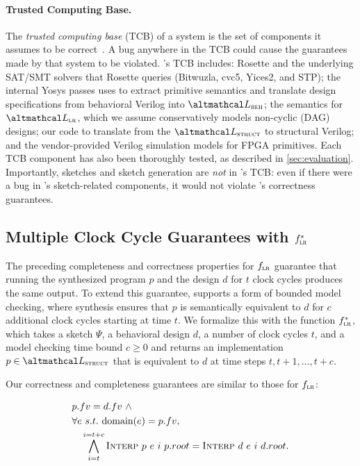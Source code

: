 \paragraph{Trusted Computing Base.}

The \textit{trusted computing base} (TCB) of a
  system is the set of components
  it assumes to be correct~\cite{MacKenzieComputingTrust}.
A bug anywhere in the TCB
  could cause the guarantees
  made by that system to be violated.
\lr's  TCB includes:
  Rosette and the underlying
      SAT/SMT solvers that Rosette queries
      (Bitwuzla, cvc5, Yices2, and STP);
  the internal Yosys passes \lr
      uses to extract primitive semantics
      and translate design specifications
      from behavioral Verilog into
      $\SpecLang$;
  the semantics for $\UberLang$,
    which we assume conservatively
    models non-cyclic (DAG) designs;
  our code to translate from
      the $\ImplLang$ to
      structural Verilog; and
  the vendor-provided Verilog
    simulation models for FPGA primitives.
Each TCB component 
  has also been thoroughly tested,
  as described in \cref{sec:evaluation}.
Importantly,
  sketches and sketch generation
  are \textit{not} in \lr's TCB: %
  even if there were a
  bug in \lr's sketch-related components,
  it would not violate
  \lr's correctness guarantees.


\subsection{Multiple Clock Cycle Guarantees with $\text{$f_{\textsc{lr}}^{*}$}$}
\label{subsec:lrfn-bmc}


The preceding completeness and 
    correctness properties for
    $\text{$f_{\textsc{lr}}$}$ 
    guarantee that
    running the
    synthesized program
    $p$ and the design $d$
    for $t$ clock cycles
    produces the same output.
To extend this guarantee, \lr supports
    a form of
    bounded model checking, 
    where
    synthesis ensures that
    $p$ is semantically equivalent
    to $d$ for $c$ additional clock cycles
    starting at time $t$.
We formalize this
    with the function $\text{$f_{\textsc{lr}}^{*}$}$,
    which takes a sketch $\Psi$,
    a behavioral design $d$,
    a number of clock cycles $t$,
    and a model checking
    time bound $c \geq 0$
    and returns an implementation
    $p \in \ImplLang$
    that is equivalent to $d$
    at time steps $t, t+1, \ldots, t + c$.
    

Our correctness and completeness guarantees are
    similar to those for $\text{$f_{\textsc{lr}}$}$:

    \small
  \begin{align*}
    & p.fv = d.fv\ \wedge \\
    &\forall e\ s.t.\ \textrm{domain}(e) = p.fv, \\
    &\quad\bigwedge_{i=t}^{i=t+c}
      {\textsc{Interp}\ p\ e\ i\ p.root = \textsc{Interp}\ d\ e\ i\ d.root}.
  \end{align*}
  \normalsize

